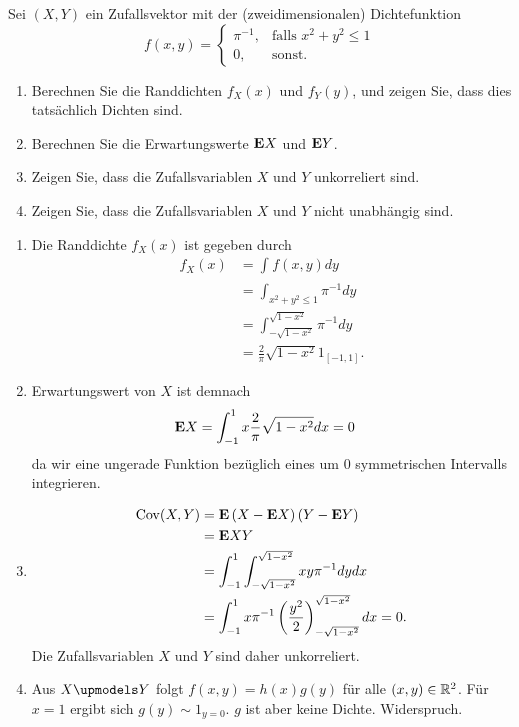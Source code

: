  Sei $(X,Y)$
ein Zufallsvektor mit der (zweidimensionalen) Dichtefunktion 
\begin{equation*}
    f(x,y) = \begin{cases}
        \pi^{-1}, & \text{falls } x^{2}+y^{2} \leq 1 \\
        0,& \text{sonst.}
    \end{cases}
\end{equation*}
\begin{enumerate}
    \item Berechnen Sie die Randdichten $f_{X}(x)$ und $f_{Y}(y)$, und zeigen
        Sie, dass dies tatsächlich Dichten sind.
        
    \item Berechnen Sie die Erwartungswerte $\mathbf{E} X$ und $\mathbf{E} Y$.

    \item Zeigen Sie, dass die Zufallsvariablen $X$ und $Y$ unkorreliert sind.
    \item Zeigen Sie, dass die Zufallsvariablen $X$ und $Y$ nicht unabhängig sind. 
\end{enumerate}

\solution 
\begin{enumerate}
    \item Die Randdichte $f_{X}(x)$ ist gegeben durch
        \begin{align*}
            f_{X}(x) &= \int_{}^{} f(x,y) dy \\
            &= \int_{x^2+y^2 \leq 1}^{} \pi^{-1} dy \\
            &= \int_{- \sqrt{1-x^2}}^{\sqrt{1-x^2}} \pi^{-1} dy \\
            &= \frac{2}{\pi} \sqrt{1-x^2} 1_{[-1,1]}.
        \end{align*}
    \item Erwartungswert von $X$ ist demnach
        \begin{align*}
            \mathbf{E} X &= \int_{-1}^{1} x \frac{2}{\pi} \sqrt{1-x^2} dx = 0
        \end{align*}
        da wir eine ungerade Funktion bezüglich eines um $0$ symmetrischen 
        Intervalls integrieren.
    \item 
        \begin{align*}
            \operatorname{Cov}(X,Y) &= \mathbf{E} \left( X-\mathbf{E} X \right)\left( Y- \mathbf{E} Y \right) \\
            &= \mathbf{E} XY \\
            &= \int_{-1}^{1} \int_{-\sqrt{1-x^2}}^{\sqrt{1-x^2}} xy \pi^{-1} dy dx \\
            &= \int_{-1}^{1} x \pi^{-1} \left( \frac{y^2}{2} \right)^{\sqrt{1-x^{2}}}_{-\sqrt{1-x^{2}}} dx = 0.
        \end{align*}
        Die Zufallsvariablen $X$ und $Y$ sind daher unkorreliert.
    \item 
        Aus $X \upmodels Y$ folgt $f(x,y) = h(x) g(y)$ für alle $(x,y) \in
        \mathbb R^{2}$. Für $x=1$ ergibt sich $g(y) \sim 1_{y=0}$. $g$ ist aber keine
        Dichte. Widerspruch.
\end{enumerate}

